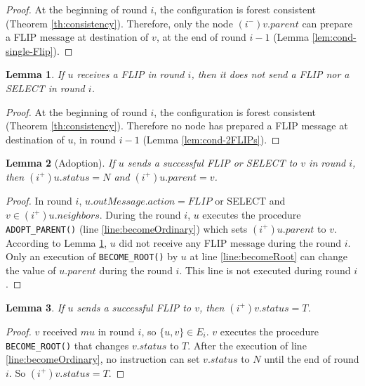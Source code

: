 \documentclass[twocolumn]{article}
\newtheorem{lemma}{Lemma}
\newcommand{\depends}[1]{}
\newcommand{\state}[3]{\ensuremath{(#2^{#3})#1}}
\newcommand{\vim}{\state{v}{i}{-}}
\newcommand{\uip}{\state{u}{i}{+}}
\newcommand{\vip}{\state{v}{i}{+}}
\begin{document}
\begin{proof}
At the beginning of round $i$, the configuration is forest consistent
(Theorem \ref{th:consistency}).
Therefore, only the node  $\vim.parent$ can prepare 
a FLIP message at destination of $v$, 
at the end of round $i-1$ (Lemma \ref{lem:cond-single-Flip}).
 \end{proof}

\begin{lemma}
 \label{lem:2FLIPs}
 If $u$ receives a FLIP in round $i$, then it does not 
send a FLIP nor a SELECT in round $i$.
\depends{\ref{th:consistency},  \ref{lem:FLIP-SELECT-T}, \ref{lem:L5}}
\end{lemma}
\begin{proof}
At the beginning of round $i$, the configuration is forest consistent
(Theorem \ref{th:consistency}).
Therefore no node has prepared a FLIP message at destination of $u$, 
in round $i-1$ (Lemma \ref{lem:cond-2FLIPs}).
 \end{proof}


\begin{lemma}[Adoption]
\label{lem:adoption}
If $u$ sends a successful FLIP or SELECT to $v$ in round $i$, then $\uip.status = N$ and $\uip.parent=v$.
\depends{\ref{lem:2FLIPs}}
\end{lemma}

\begin{proof}
In round $i$, $u.outMessage.action=FLIP$ or SELECT  
and $v \in \uip.neighbors$. 
During the round $i$, $u$ executes the procedure \texttt{ADOPT\_PARENT()} 
(line \ref{line:becomeOrdinary})  
which sets $\uip.parent$ to $v$. 
According to Lemma \ref{lem:2FLIPs}, $u$ did not receive any FLIP 
message during the round $i$.
Only an execution of \texttt{BECOME\_ROOT()} by $u$ 
at line \ref{line:becomeRoot} can 
change the value of $u.parent$ 
during the round $i$. This line is not executed during round $i$.
 \end{proof}

\begin{lemma}
\label{lem:received-FLIP}
  If $u$ sends a successful FLIP to $v$, then $\vip.status = T$.
\depends{\ref{lem:2FLIPs}, \ref{lem:single-Flip}}
\end{lemma}

\begin{proof}
$v$ received $mu$ in round $i$, so $\{u,v\}\in E_i$.
$v$ executes the procedure \texttt{BECOME\_ROOT()} 
that changes $v.status$ to $T$. 
After the execution of line \ref{line:becomeOrdinary}, 
no instruction can set $v.status$ to $N$
until the end of round $i$. So $\vip.status = T$.
 \end{proof}
\end{document}
